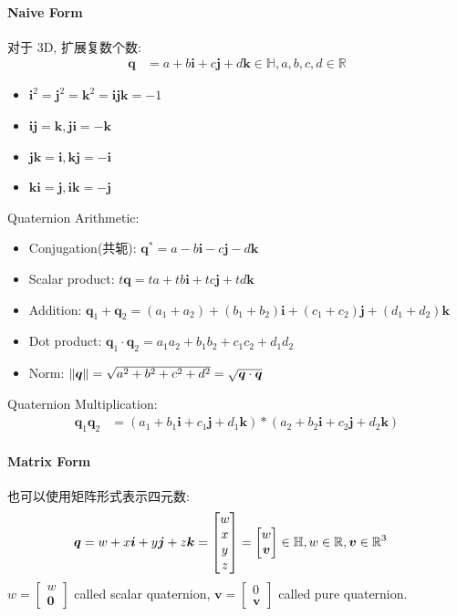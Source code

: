 \paragraph{Naive Form} 对于 3D, 扩展复数个数:
\begin{align*}
    \bm q &= a +b\bm i + c\bm j + d\bm k\in \mathbb{H}, a,b,c,d\in \mathbb{R}
\end{align*}
\begin{itemize}
    \item $\bm i^2 = \bm j^2 = \bm k^2=\bm{ijk} = -1$
    \item $\bm{ij}=\bm k, \bm{ji}=-\bm k$ 
    \item $\bm{jk}=\bm i, \bm{kj}=-\bm i$
    \item $\bm{ki}=\bm j, \bm{ik}=-\bm j$
\end{itemize}

Quaternion Arithmetic:
\begin{itemize}
    \item Conjugation(共轭): $\bm q^*=a-b\bm i - c\bm j - d\bm k$
    \item Scalar product: $t\bm q = ta +tb\bm i + tc\bm j + td\bm k$
    \item Addition: $\bm q_1 + \bm q_2= (a_1+a_2) +(b_1+b_2)\bm i + (c_1+c_2)\bm j + (d_1+d_2)\bm k$
    \item Dot product: $\bm q_1\cdot \bm q_2 = a_1a_2+b_1b_2+c_1c_2+d_1d_2$
    \item Norm: $\left\lVert\bm q\right\rVert=\sqrt{a^2+b^2+c^2+d^2}=\sqrt{\bm q \cdot \bm q}$
\end{itemize}

Quaternion Multiplication:
\begin{align*}
    \bm q_1\bm q_2&=(a_1 +b_1\bm i + c_1\bm j + d_1\bm k)*(a_2 +b_2\bm i + c_2\bm j + d_2\bm k)
\end{align*}

\paragraph{Matrix Form} 也可以使用矩阵形式表示四元数:
\begin{align*}
    \bm q &= w +x\bm i + y\bm j + z\bm k=\begin{bmatrix}
        w\\x\\y\\z\\
    \end{bmatrix}=\begin{bmatrix}
        w\\ \bm v
    \end{bmatrix}\in\mathbb{H}, w\in\mathbb{R}, \bm v\in \mathbb{R}^3
\end{align*}
$w=\begin{bmatrix}
    w\\\bm 0
\end{bmatrix}$ called scalar quaternion, $\bm v=\begin{bmatrix}
    0\\\bm v
\end{bmatrix}$ called pure quaternion.

